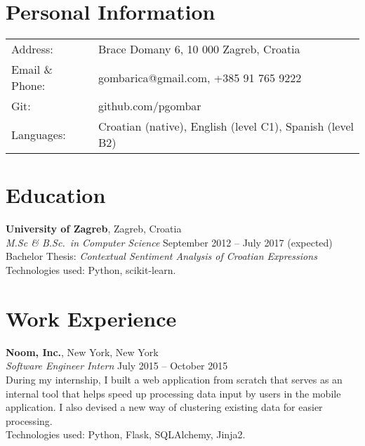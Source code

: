 \documentclass[margin,line]{resume}
\begin{document}
\begin{resume}

\section{\mysidestyle Personal Information}

\begin{tabular}{@{}ll@{}}
Address: & Brace Domany 6, 10 000 Zagreb, Croatia \\
Email \& Phone: & gombarica@gmail.com, +385 91 765 9222 \\
Git: & github.com/pgombar \\
Languages: & Croatian (native), English (level C1), Spanish (level B2) \\
\end{tabular}

\vspace{2mm}
\section{\mysidestyle Education}

\textbf{University of Zagreb}, Zagreb, Croatia \vspace{2mm}\\\vspace{1mm}%
\textsl{M.Sc \& B.Sc.\ in Computer Science} \hfill September 2012 -- July 2017 (expected)\\%
Bachelor Thesis: \textit{Contextual Sentiment Analysis of Croatian Expressions}\\
Technologies used: Python, scikit-learn.
\vspace{-3mm}\hspace{-1mm}\hfill%

\vspace{2mm}
\section{\mysidestyle Work Experience}

\textbf{Noom, Inc.}, New York, New York \vspace{2mm}\\\vspace{1mm}%
\textsl{Software Engineer Intern} \hfill July 2015 -- October 2015\\%
During my internship, I built a web application from scratch that serves as an internal tool that helps speed up processing data input by users in the mobile application. I also devised a new way of clustering existing data for easier processing. \\
Technologies used: Python, Flask, SQLAlchemy, Jinja2.


\end{resume}
\end{document}
